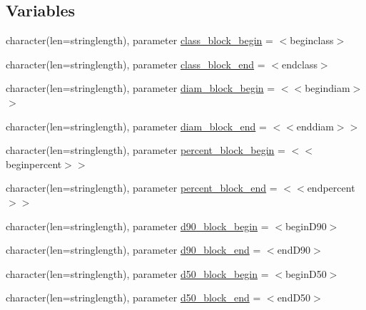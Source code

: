 \subsection*{Variables}
\begin{DoxyCompactItemize}
\item 
character(len=stringlength), parameter \mbox{\hyperlink{namespacemodulesand_a795643cefd171a7db1134d23315ba7d6}{class\+\_\+block\+\_\+begin}} = \textquotesingle{}$<$beginclass$>$\textquotesingle{}
\item 
character(len=stringlength), parameter \mbox{\hyperlink{namespacemodulesand_a4998e9d59abb169c48298b823f3233eb}{class\+\_\+block\+\_\+end}} = \textquotesingle{}$<$endclass$>$\textquotesingle{}
\item 
character(len=stringlength), parameter \mbox{\hyperlink{namespacemodulesand_add435f0a101432372b5402d3e60ff9f7}{diam\+\_\+block\+\_\+begin}} = \textquotesingle{}$<$$<$begindiam$>$$>$\textquotesingle{}
\item 
character(len=stringlength), parameter \mbox{\hyperlink{namespacemodulesand_a060d45bf13a22de07462deb2c0661360}{diam\+\_\+block\+\_\+end}} = \textquotesingle{}$<$$<$enddiam$>$$>$\textquotesingle{}
\item 
character(len=stringlength), parameter \mbox{\hyperlink{namespacemodulesand_ab5cb49dc51d45faf18b962a5c3f85a93}{percent\+\_\+block\+\_\+begin}} = \textquotesingle{}$<$$<$beginpercent$>$$>$\textquotesingle{}
\item 
character(len=stringlength), parameter \mbox{\hyperlink{namespacemodulesand_aae26fa01d2e146d7d5f278f77a70fa34}{percent\+\_\+block\+\_\+end}} = \textquotesingle{}$<$$<$endpercent$>$$>$\textquotesingle{}
\item 
character(len=stringlength), parameter \mbox{\hyperlink{namespacemodulesand_ac8ea818b42ebdcf5d37ba24d99c1d8a3}{d90\+\_\+block\+\_\+begin}} = \textquotesingle{}$<$begin\+D90$>$\textquotesingle{}
\item 
character(len=stringlength), parameter \mbox{\hyperlink{namespacemodulesand_a3ccd7bede6595e8c01d41db55c580574}{d90\+\_\+block\+\_\+end}} = \textquotesingle{}$<$end\+D90$>$\textquotesingle{}
\item 
character(len=stringlength), parameter \mbox{\hyperlink{namespacemodulesand_aeffe6964e3a87b520ec752ffb006f43a}{d50\+\_\+block\+\_\+begin}} = \textquotesingle{}$<$begin\+D50$>$\textquotesingle{}
\item 
character(len=stringlength), parameter \mbox{\hyperlink{namespacemodulesand_a96c437c16b4759e6388e3659d6eac486}{d50\+\_\+block\+\_\+end}} = \textquotesingle{}$<$end\+D50$>$\textquotesingle{}

\end{DoxyCompactItemize}
